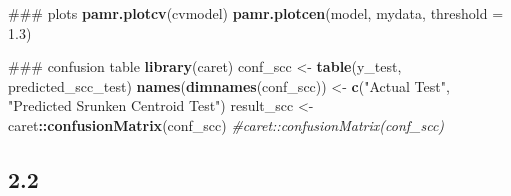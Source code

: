 \documentclass[]{article}
\newenvironment{Shaded}{\begin{snugshade}}{\end{snugshade}}
\newcommand{\KeywordTok}[1]{\textcolor[rgb]{0.13,0.29,0.53}{\textbf{#1}}}
\newcommand{\DataTypeTok}[1]{\textcolor[rgb]{0.13,0.29,0.53}{#1}}
\newcommand{\DecValTok}[1]{\textcolor[rgb]{0.00,0.00,0.81}{#1}}
\newcommand{\FloatTok}[1]{\textcolor[rgb]{0.00,0.00,0.81}{#1}}
\newcommand{\StringTok}[1]{\textcolor[rgb]{0.31,0.60,0.02}{#1}}
\newcommand{\CommentTok}[1]{\textcolor[rgb]{0.56,0.35,0.01}{\textit{#1}}}
\newcommand{\OtherTok}[1]{\textcolor[rgb]{0.56,0.35,0.01}{#1}}
\newcommand{\OperatorTok}[1]{\textcolor[rgb]{0.81,0.36,0.00}{\textbf{#1}}}
\newcommand{\NormalTok}[1]{#1}
\begin{document}
\begin{Shaded}
\begin{Highlighting}[]
\NormalTok{### plots}
\KeywordTok{pamr.plotcv}\NormalTok{(cvmodel)}
\KeywordTok{pamr.plotcen}\NormalTok{(model, mydata, }\DataTypeTok{threshold =} \FloatTok{1.3}\NormalTok{)}
\end{Highlighting}
\end{Shaded}

\begin{Shaded}
\end{Shaded}

\begin{Shaded}
\begin{Highlighting}[]
\NormalTok{### confusion table}
\KeywordTok{library}\NormalTok{(caret)}
\NormalTok{conf_scc <-}\StringTok{ }\KeywordTok{table}\NormalTok{(y_test, predicted_scc_test)}
\KeywordTok{names}\NormalTok{(}\KeywordTok{dimnames}\NormalTok{(conf_scc)) <-}\StringTok{ }\KeywordTok{c}\NormalTok{(}\StringTok{"Actual Test"}\NormalTok{, }\StringTok{"Predicted Srunken Centroid Test"}\NormalTok{)}
\NormalTok{result_scc <-}\StringTok{ }\NormalTok{caret}\OperatorTok{::}\KeywordTok{confusionMatrix}\NormalTok{(conf_scc)}
\CommentTok{#caret::confusionMatrix(conf_scc)}
\end{Highlighting}
\end{Shaded}

\subsection{2.2}\label{section-1}
\end{document}
